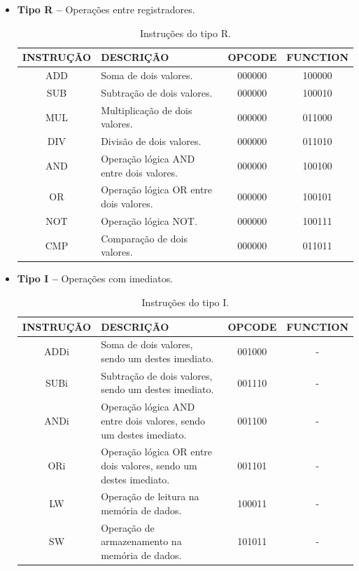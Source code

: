 \documentclass{report}
\begin{document}
  \begin{itemize}
    \item \textbf{Tipo R --} Operações entre registradores.
    
	\begin{table}[H]
	\centering
	\begin{tabular}{|c|m{6cm}|c|c|}
  	\hline 
  	\textbf{INSTRUÇÃO} & \textbf{DESCRIÇÃO} & \textbf{OPCODE} & \textbf{FUNCTION} \\ 
  	\hline   	
  	ADD & Soma de dois valores. & 000000 & 100000 \\ \hline
  	SUB & Subtração de dois valores. & 000000 & 100010 \\ \hline
  	MUL & Multiplicação de dois valores. & 000000 & 011000 \\ \hline
  	DIV & Divisão de dois valores. & 000000 & 011010 \\ \hline
  	AND & Operação lógica AND entre dois valores. & 000000 & 100100 \\ \hline
  	OR  & Operação lógica OR entre dois valores. & 000000 & 100101 \\ \hline
  	NOT & Operação lógica NOT. & 000000 & 100111 \\ \hline
  	CMP & Comparação de dois valores. & 000000 & 011011 \\ \hline
  	\end{tabular} 
  	\caption{Instruções do tipo R.}
  \end{table}
  \newpage    

    \item \textbf{Tipo I --} Operações com imediatos.
    
	\begin{table}[H]
	\centering
	\begin{tabular}{|c|m{6cm}|c|c|}
  	\hline 
  	\textbf{INSTRUÇÃO} & \textbf{DESCRIÇÃO} & \textbf{OPCODE} & \textbf{FUNCTION} \\ 
  	\hline 
  	ADDi & Soma de dois valores, sendo um destes imediato. & 001000 & - \\ \hline
  	SUBi & Subtração de dois valores, sendo um destes imediato. & 001110 & - \\ \hline
  	ANDi & Operação lógica AND entre dois valores, sendo um destes imediato. & 001100 & - \\ \hline
  	ORi  & Operação lógica OR entre dois valores, sendo um destes imediato. & 001101 & - \\ \hline
    LW   & Operação de leitura na memória de dados. & 100011 & - \\ \hline
    SW   & Operação de armazenamento na memória de dados. & 101011 & - \\ \hline
  	\end{tabular} 
  	\caption{Instruções do tipo I.}
  \end{table}
    

\end{itemize}
\end{document}
